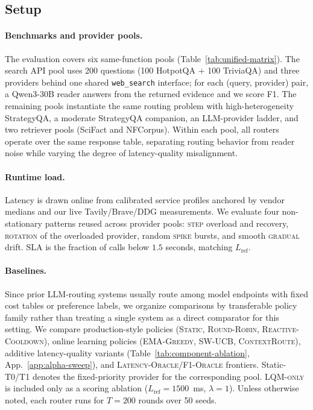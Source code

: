 \documentclass[11pt]{article}
\newcommand{\contextroute}{\textsc{ContextRoute}}
\newcommand{\lqm}{\textsc{LQM-only}}
\begin{document}
\subsection{Setup}
\paragraph{Benchmarks and provider pools.} The evaluation covers six same-function pools (Table~\ref{tab:unified-matrix}). The search API pool uses 200 questions (100 HotpotQA + 100 TriviaQA) and three providers behind one shared \texttt{web\_search} interface; for each (query, provider) pair, a Qwen3-30B reader answers from the returned evidence and we score F1. The remaining pools instantiate the same routing problem with high-heterogeneity StrategyQA, a moderate StrategyQA companion, an LLM-provider ladder, and two retriever pools (SciFact and NFCorpus). Within each pool, all routers operate over the same response table, separating routing behavior from reader noise while varying the degree of latency-quality misalignment.

\paragraph{Runtime load.} Latency is drawn online from calibrated service profiles anchored by vendor medians and our live Tavily/Brave/DDG measurements. We evaluate four non-stationary patterns reused across provider pools: \textsc{step} overload and recovery, \textsc{rotation} of the overloaded provider, random \textsc{spike} bursts, and smooth \textsc{gradual} drift. SLA is the fraction of calls below $1.5$ seconds, matching $L_{\text{ref}}$.

\paragraph{Baselines.} Since prior LLM-routing systems usually route among model endpoints with fixed cost tables or preference labels, we organize comparisons by transferable policy family rather than treating a single system as a direct comparator for this setting. We compare production-style policies (\textsc{Static}, \textsc{Round-Robin}, \textsc{Reactive-Cooldown}), online learning policies (\textsc{EMA-Greedy}, \textsc{SW-UCB}, \contextroute{}), additive latency-quality variants (Table~\ref{tab:component-ablation}, App.~\ref{app:alpha-sweep}), and \textsc{Latency-Oracle}/\textsc{F1-Oracle} frontiers. Static-T0/T1 denotes the fixed-priority provider for the corresponding pool. \lqm{} is included only as a scoring ablation ($L_{\text{ref}}=1500$~ms, $\lambda=1$). Unless otherwise noted, each router runs for $T=200$ rounds over 50 seeds.
\end{document}
